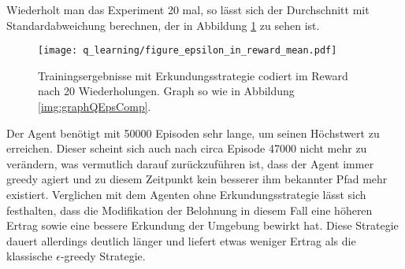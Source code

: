 Wiederholt man das Experiment 20 mal, so lässt sich der Durchschnitt mit Standardabweichung berechnen, der in Abbildung \ref{img:graphQEpsInRewMean} zu sehen ist.
\begin{figure}[H]
    \centering
    \texttt{[image: q\_learning/figure\_epsilon\_in\_reward\_mean.pdf]}
    \caption{Trainingsergebnisse mit Erkundungsstrategie codiert im Reward nach 20 Wiederholungen. Graph so wie in Abbildung \ref{img:graphQEpsComp}.} \label{img:graphQEpsInRewMean}
\end{figure}
Der Agent benötigt mit 50000 Episoden sehr lange, um seinen Höchstwert zu erreichen. Dieser scheint sich auch nach circa Episode 47000 nicht mehr zu verändern, was vermutlich darauf zurückzuführen ist, dass der Agent immer greedy agiert und zu diesem Zeitpunkt kein besserer ihm bekannter Pfad mehr existiert. Verglichen mit dem Agenten ohne Erkundungsstrategie lässt sich festhalten, dass die Modifikation der Belohnung in diesem Fall eine höheren Ertrag sowie eine bessere Erkundung der Umgebung bewirkt hat. Diese Strategie dauert allerdings deutlich länger und liefert etwas weniger Ertrag als die klassische $ \epsilon $-greedy Strategie.